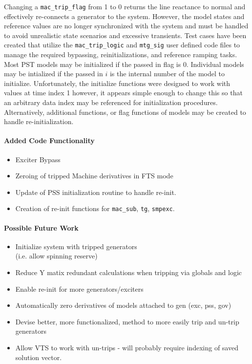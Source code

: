 \documentclass[12pt]{article}
\begin{document}
Changing a \verb|mac_trip_flag| from 1 to 0 returns the line reactance to normal and effectively re-connects a generator to the system.
However, the model states and reference values are no longer synchronized with the system and must be handled to avoid unrealistic state scenarios and excessive transients.
Test cases have been created that utilize the  \verb|mac_trip_logic| and \verb|mtg_sig| user defined code files to manage the required bypassing, reinitializations, and reference ramping tasks.\\


Most PST models may be initialized if the passed in flag is 0.
Individual models may be intialized if the passed in $i$ is the internal number of the model to initialize.
Unfortunately, the initialize functions were designed to work with values at time index 1 however, it appears simple enough to change this so that an arbitrary data index may be referenced for initialization procedures.
Alternatively, additional functions, or flag functions of models may be created to handle re-initialization.\\


\begin{minipage}[t]{0.47\linewidth}
\raggedright
\footnotesize
\paragraph{Added Code Functionality}
\begin{itemize}
 em
\item Exciter Bypass
\item Zeroing of tripped Machine derivatives in FTS mode
\item Update of PSS initialization routine to handle re-init.
\item Creation of re-init functions for \verb|mac_sub|, \verb|tg|, \verb|smpexc|.
\end{itemize}
\vfill \null
\end{minipage}%
\begin{minipage}[t]{0.47\linewidth}
\raggedright
\footnotesize
\paragraph{Possible Future Work}
\begin{itemize}
 em
\item Initialize system with tripped generators\\ (i.e. allow spinning reserve)
\item Reduce Y matix redundant calculations when tripping via globals and logic
\item Enable re-init for more generators/exciters
\item Automatically zero derivatives of models attached to gen (exc, pss, gov)
\item Devise better, more functionalized, method to more easily trip and un-trip generators 
\item Allow VTS to work with un-trips - will probably require indexing of saved solution vector.
\end{itemize}
\end{minipage}%
\end{document}
